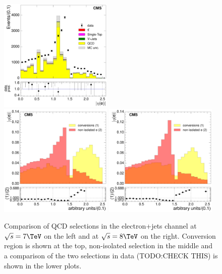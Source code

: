 \begin{figure}[hbtp]
      \includegraphics[width=0.48\textwidth]{Chapters/04_Analysis/04b_XSections/images/control_plots/before_fit/8TeV/qcd_plots/QCD_electron_AbsEta_non_iso_control_region_0btag_with_ratio}\\
      \includegraphics[width=0.48\textwidth]{Chapters/04_Analysis/04b_XSections/images/control_plots/before_fit/7TeV/qcd_plots/shape_comparisons/QCD_electron_AbsEta_control_region_comparison_0btag}\hfill
      \includegraphics[width=0.48\textwidth]{Chapters/04_Analysis/04b_XSections/images/control_plots/before_fit/8TeV/qcd_plots/shape_comparisons/QCD_electron_AbsEta_control_region_comparison_0btag}\\
     \caption{Comparison of QCD selections in the electron+jets channel at $\sqrt{s}=7\TeV$ on the left
     and at $\sqrt{s}=8\TeV$ on the right. Conversion region is shown at the top, non-isolated selection
     in the middle and a comparison of the two selections in data (TODO:CHECK THIS)
     is shown in the lower plots.}
     \label{fig:data_mc_comparison_electron_QCD}
 \end{figure}

